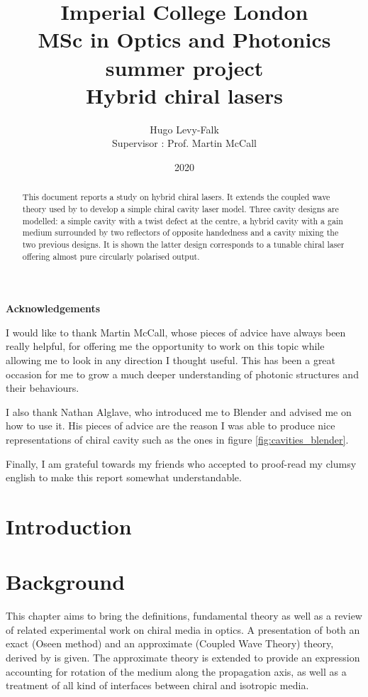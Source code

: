 \documentclass{report}
\title{Imperial College London\\MSc in Optics and Photonics summer project\\Hybrid chiral lasers}
\author{Hugo Levy-Falk\\Supervisor : Prof. Martin McCall}
\date{2020}
\newenvironment{acknowledgements}%
{\cleardoublepage\thispagestyle{empty}\null\vfill\begin{center}%
		\bfseries Acknowledgements\end{center}}%
{\vfill\null}
\begin{document}
	
\maketitle

\begin{abstract}
	
	This document reports a study on hybrid chiral lasers. It extends the coupled wave theory used by  to develop a simple chiral cavity laser model. Three cavity designs are modelled: a simple cavity with a twist defect at the centre, a hybrid cavity with a gain medium surrounded by two reflectors of opposite handedness and a cavity mixing the two previous designs. It is shown the latter design corresponds to a tunable chiral laser offering almost pure circularly polarised output.

\end{abstract}

\begin{acknowledgements}
	I would like to thank Martin McCall, whose pieces of advice have always been really helpful, for offering me the opportunity to work on this topic while allowing me to look in any direction I thought useful. This has been a great occasion for me to grow a much deeper understanding of photonic structures and their behaviours.
	
	I also thank Nathan Alglave, who introduced me to Blender and advised me on how to use it. His pieces of advice are the reason I was able to produce nice representations of chiral cavity such as the ones in figure \ref{fig:cavities_blender}.
	
	Finally, I am grateful towards my friends who accepted to proof-read my clumsy english to make this report somewhat understandable.
\end{acknowledgements}

\tableofcontents
\listoffigures

\chapter{Introduction}

\chapter{Background}
This chapter aims to bring the definitions, fundamental theory as well as a review of related experimental work on chiral media in optics. A presentation of both an exact (Oseen method) and an approximate (Coupled Wave Theory) theory, derived by \textcite{mccall_simplified_2009} is given. The approximate theory is extended to provide an expression accounting for rotation of the medium along the propagation axis, as well as a treatment of all kind of interfaces between chiral and isotropic media. 






\end{document}
